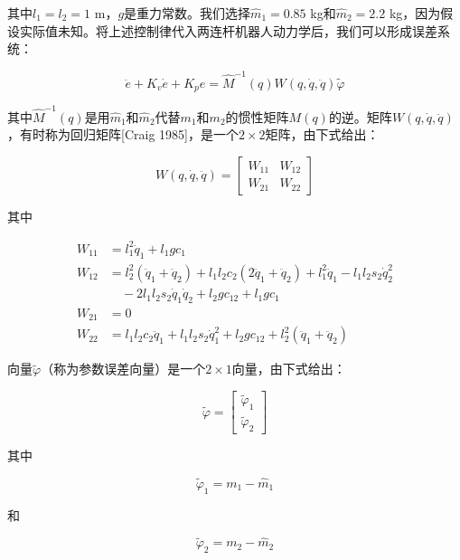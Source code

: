 \documentclass[12pt,a4paper]{ctexart}
\begin{document}
其中$l_1 = l_2 = 1$ m，$g$是重力常数。我们选择$\hat{m}_1 = 0.85$ kg和$\hat{m}_2 = 2.2$ kg，因为假设实际值未知。将上述控制律代入两连杆机器人动力学后，我们可以形成误差系统：

\begin{equation*}
\ddot{e} + K_v\dot{e} + K_p e = \hat{M}^{-1}(q)W(q,\dot{q},\ddot{q})\tilde{\varphi}
\end{equation*}

其中$\hat{M}^{-1}(q)$是用$\hat{m}_1$和$\hat{m}_2$代替$m_1$和$m_2$的惯性矩阵$M(q)$的逆。矩阵$W(q, \dot{q}, \ddot{q})$，有时称为回归矩阵[Craig 1985]，是一个$2 \times 2$矩阵，由下式给出：

\begin{equation*}
W(q,\dot{q},\ddot{q}) = \begin{bmatrix} W_{11} & W_{12} \\ W_{21} & W_{22} \end{bmatrix}
\end{equation*}

其中

\begin{align}
W_{11} &= l_1^2\ddot{q}_1 + l_1 g c_1 \nonumber\\
W_{12} &= l_2^2(\ddot{q}_1 + \ddot{q}_2) + l_1 l_2 c_2(2\ddot{q}_1 + \ddot{q}_2) + l_1^2\ddot{q}_1 - l_1 l_2 s_2\dot{q}_2^2 \nonumber\\
&\quad - 2l_1 l_2 s_2\dot{q}_1\dot{q}_2 + l_2 g c_{12} + l_1 g c_1 \nonumber\\
W_{21} &= 0 \nonumber\\
W_{22} &= l_1 l_2 c_2\ddot{q}_1 + l_1 l_2 s_2\dot{q}_1^2 + l_2 g c_{12} + l_2^2(\ddot{q}_1 + \ddot{q}_2)
\end{align}

向量$\tilde{\varphi}$（称为参数误差向量）是一个$2 \times 1$向量，由下式给出：

\begin{equation*}
\tilde{\varphi} = \begin{bmatrix} \tilde{\varphi}_1 \\ \tilde{\varphi}_2 \end{bmatrix}
\end{equation*}

其中

\begin{equation}
\tilde{\varphi}_1 = m_1 - \hat{m}_1
\end{equation}

和

\begin{equation}
\tilde{\varphi}_2 = m_2 - \hat{m}_2
\end{equation}
\end{document}
